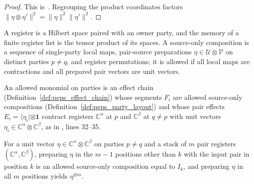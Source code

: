 \begin{proof}\leanok
    This is~\cite[``Combining pair vectors'']{QICLean2026Blueprint}.
    Regrouping the product coordinates factors
    $\|\eta\otimes\eta'\|^2=\|\eta\|^2\|\eta'\|^2$.
\end{proof}

\begin{definition}
    \label{def:peps_party_layout}
    \leanok
    A register is a Hilbert space paired with an owner party, and the memory of
    a finite register list is the tensor product of its spaces. A source-only
    composition is a sequence of single-party local maps, pair-source
    preparations $\eta\in\mathcal U\otimes\mathcal V$ on distinct parties
    $p\ne q$, and register permutations; it is allowed if all local maps are
    contractions and all prepared pair vectors are unit vectors.
\end{definition}

\begin{definition}
    \label{def:peps_party_monomial}
    \leanok
    An allowed monomial on parties is an effect chain
    (Definition~\ref{def:peps_effect_chain}) whose segments $F_i$ are allowed
    source-only compositions (Definition~\ref{def:peps_party_layout}) and whose
    pair effects $E_i=\langle\eta_i|\otimes\mathbf 1$ contract registers
    $\mathbb C^\alpha$ at $p$ and $\mathbb C^\beta$ at $q\ne p$ with unit
    vectors $\eta_i\in\mathbb C^\alpha\otimes\mathbb C^\beta$, as in
    \cite[Section~5.1]{OpenAI2026PolynomialPEPS}, lines 32--35.
\end{definition}

\begin{lemma}
    \label{thm:peps_insertion_by_sources}
    \leanok
    For a unit vector $\eta\in\mathbb C^\alpha\otimes\mathbb C^\beta$ on parties
    $p\ne q$ and a stack of $m$ pair registers $(\mathbb C^\alpha,\mathbb C^\beta)$,
    preparing $\eta$ in the $m-1$ positions other than $k$ with the input pair
    in position $k$ is an allowed source-only composition equal to $I_k$, and
    preparing $\eta$ in all $m$ positions yields $\eta^{\otimes m}$.
\end{lemma}

